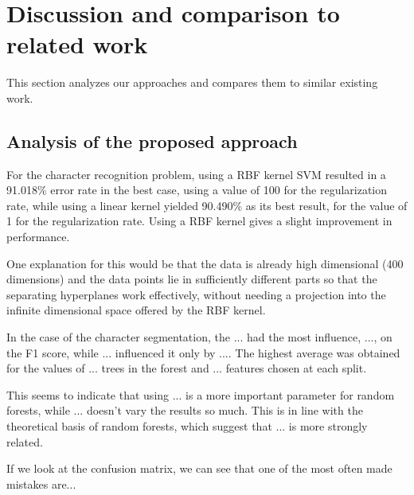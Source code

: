 \section{Discussion and comparison to related work}

This section analyzes our approaches and compares them to similar existing work.

\subsection{Analysis of the proposed approach}
For the character recognition problem, using a RBF kernel SVM resulted in a 91.018\%  error rate in the best case, using a value of 100 for the regularization rate, while using a linear kernel yielded 90.490\%  as its best result, for the value of 1 for the regularization rate. Using a RBF kernel gives a slight improvement in performance.

One explanation for this would be that the data is already high dimensional (400 dimensions) and the data points lie in sufficiently different parts so that the separating hyperplanes work effectively, without needing a projection into the infinite dimensional space offered by the RBF kernel. 

In the case of the character segmentation, the ... had the most influence, ..., on the F1 score, while ... influenced it only by .... The highest average was obtained for the values of ... trees in the forest and ... features chosen at each split. 

This seems to indicate that using ... is a more important parameter for random forests, while ... doesn't vary the results so much. This is in line with the theoretical basis of random forests, which suggest that ... is more strongly related. 

If we look at the confusion matrix, we can see that one of the most often made mistakes are...

